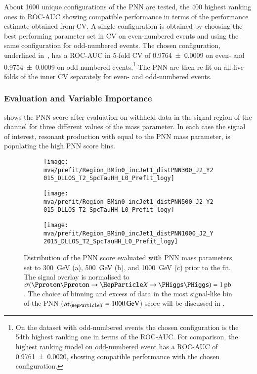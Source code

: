 About 1600 unique configurations of the PNN are tested, the 400
highest ranking ones in ROC-AUC showing compatible performance in
terms of the performance estimate obtained from CV. A single
configuration is obtained by choosing the best performing parameter
set in CV on even-numbered events and using the same configuration for
odd-numbered events. The chosen configuration, underlined
in~, has a ROC-AUC in 5-fold CV of
\num{0.9764 +- 0.0009} on even- and \num{0.9754 +- 0.0009} on
odd-numbered events.\footnote{On the dataset with odd-numbered events
  the chosen configuration is the 54th highest ranking one in terms of
  the ROC-AUC. For comparison, the highest ranking model on
  odd-numbered event has a ROC-AUC of \num{0.9761 +- 0.0020}, showing
  compatible performance with the chosen configuration.} The PNN are
then re-fit on all five folds of the inner CV separately for even- and
odd-numbered events.

\subsubsection{Evaluation and Variable Importance}

 shows the PNN score after evaluation on
withheld data in the signal region of the \hadhad channel for three
different values of the mass parameter. In each case the signal of
interest, resonant \HH production with \mX equal to the PNN mass
parameter, is populating the high PNN score bins.

\begin{figure}[htbp]
  \centering

  \begin{subfigure}[t]{.49\textwidth}
    \texttt{[image: mva/prefit/Region\_BMin0\_incJet1\_distPNN300\_J2\_Y2015\_DLLOS\_T2\_SpcTauHH\_L0\_Prefit\_logy]}
    \caption{}
    \label{fig:pnn_score_prefit_300}
  \end{subfigure}\hfill%
  \begin{subfigure}[t]{.49\textwidth}
    \centering
    \texttt{[image: mva/prefit/Region\_BMin0\_incJet1\_distPNN500\_J2\_Y2015\_DLLOS\_T2\_SpcTauHH\_L0\_Prefit\_logy]}
    \caption{}
    \label{fig:pnn_score_prefit_500}
  \end{subfigure}

  \begin{subfigure}[t]{.49\textwidth}
    \centering
    \texttt{[image: mva/prefit/Region\_BMin0\_incJet1\_distPNN1000\_J2\_Y2015\_DLLOS\_T2\_SpcTauHH\_L0\_Prefit\_logy]}
    \caption{}
    \label{fig:pnn_score_prefit_1000}
  \end{subfigure}

  \caption{Distribution of the PNN score evaluated with PNN mass
    parameters set to \SI{300}{\GeV} (a), \SI{500}{\GeV} (b), and
    \SI{1000}{\GeV} (c) prior to the fit.  The signal overlay is
    normalised to
    $\sigma(\Pproton\Pproton \to \PX \to \HH) =
    \SI{1}{\pico\barn}$. The choice of binning and excess of data in
    the most signal-like bin of the PNN ($\mX = \SI{1000}{\GeV}$)
    score will be discussed in .}%
  \label{fig:pnn_score_prefit}
\end{figure}

